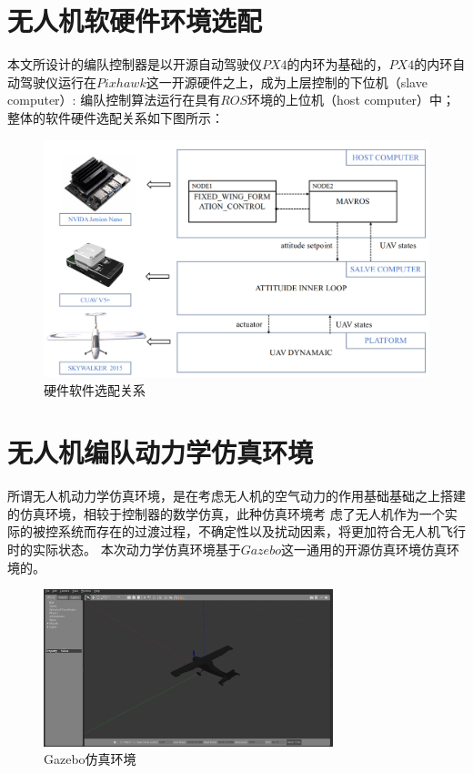 \section{无人机软硬件环境选配}
本文所设计的编队控制器是以开源自动驾驶仪$PX4$的内环为基础的，$PX4$的内环自动驾驶仪运行在$Pixhawk$这一开源硬件之上，成为上层控制的下位机（slave computer）:
编队控制算法运行在具有$ROS$环境的上位机（host computer）中；
整体的软件硬件选配关系如下图所示：
\begin{figure}[H]
    \centering
    \includegraphics[width=1\textwidth]{figures/c4/c4-soft-hard.png}
    \caption{硬件软件选配关系}\label{fig:c4-soft-hard.png}
\end{figure}
\section{无人机编队动力学仿真环境}
所谓无人机动力学仿真环境，是在考虑无人机的空气动力的作用基础基础之上搭建的仿真环境，相较于控制器的数学仿真，此种仿真环境考
虑了无人机作为一个实际的被控系统而存在的过渡过程，不确定性以及扰动因素，将更加符合无人机飞行时的实际状态。
本次动力学仿真环境基于$Gazebo$这一通用的开源仿真环境仿真环境的。
\begin{figure}[H]
    \centering
    \includegraphics[width=0.75\textwidth]{figures/c4/Gazebo.png}
    \caption{Gazebo仿真环境}\label{fig:c4-Gazebo}
\end{figure}

